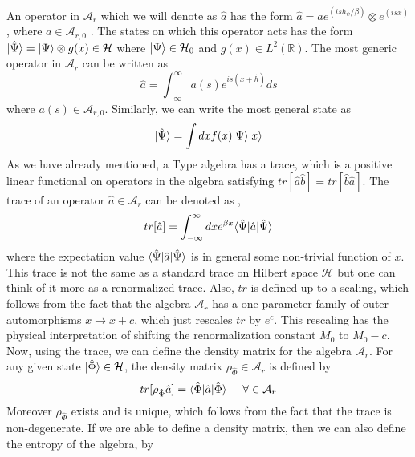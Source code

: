 \documentclass[12pt]{article}
\DeclarePairedDelimiter\bra{\langle}{\rvert}
\DeclarePairedDelimiter\ket{\lvert}{\rangle}
\newcommand{\RomanNumeralCaps}[1]
    {\MakeUppercase{\romannumeral #1}}
\begin{document}
An operator in $\mathcal{A}_{r}$ which we will denote as $\hat {a}$  has the form $\hat {a}= a e^{({is h_{\psi}/\beta}) }\otimes e^{(isx)}$, where $a \in \mathcal{A}_{r,0}$ . The states on which this operator acts has the form $\ket {\hat{\Psi}}=\ket{\Psi}\otimes g(x) \in \mathcal{H}$ where $\ket{\Psi} \in \mathcal{H}_0$ and $g(x)\in L^2(\mathbb{R})$. The most generic operator in $\mathcal{A}_r$ can be written as
\begin{equation}\label{II8}
\hat{a}=\int_{-\infty}^{\infty}a(s)e^{is(x+\hat{h})} ds
\end{equation}
 where $a(s)\in \mathcal{A}_{r,0}$. Similarly, we can write the most general state as
\begin{equation}\label{II9}
\ket{\hat{\Psi}}= \int dx f(x)\ket{\Psi} \ket{x}
\end{equation}
 As we have already  mentioned, a Type \RomanNumeralCaps {2} algebra has a trace, which is a positive linear functional on operators in the algebra satisfying $tr[\hat{a}\hat{b}]=tr[\hat{b}\hat{a}]$. The trace of an operator $\hat{a}\in \mathcal{A}_r$ can be denoted as \cite{VGE},
\begin{equation}\label{II10}
tr [\hat{a}]= \int_{-\infty}^{\infty} dx e^{\beta x}\bra{\hat{\Psi}}\hat{a}\ket{\hat{\Psi}}
\end{equation}
where the expectation value $\bra{\hat{\Psi}}\hat{a}\ket{\hat{\Psi}}$ is in general some non-trivial function of $x$. This trace is not the same as a standard trace on Hilbert space $\mathcal{H}$  but one can think of it more as a renormalized trace. Also, $tr$ is defined up to a scaling, which follows from the fact that the algebra $\mathcal{A}_r$ has a one-parameter family of outer automorphisms $x\rightarrow x+c$, which just rescales $tr$ by $e^c$. This rescaling has the physical interpretation of shifting the renormalization constant $M_0$ to $M_0 -c$. Now, using the trace, we can define the density matrix for the algebra $\mathcal{A}_r$. For any given state $\ket{\hat{\Phi}}\in \mathcal{H}$, the density matrix $\rho_{\hat{\Phi}} \in \mathcal{A}_{r}$ is defined by
\begin{equation}\label{II11}
tr[\rho_{\hat{\Phi}} \hat{a}]= \bra{\hat{\Phi}} \hat{a}\ket{\hat{\Phi}} \hspace{5mm} \forall \in \mathcal{A}_r
\end{equation}
  Moreover $\rho_{\hat{\Phi}}$ exists and is unique, which follows from the fact that the trace is non-degenerate. If we are able to define a density matrix, then we can also define the entropy of the algebra, by
\end{document}
